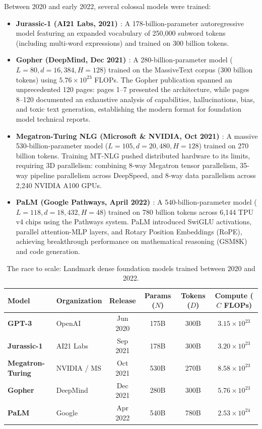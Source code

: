 \documentclass[../../main.tex]{subfiles}
\begin{document}
Between 2020 and early 2022, several colossal models were trained:
\begin{itemize}
    \item \textbf{Jurassic-1 (AI21 Labs, 2021) \cite{lieber2021jurassic}}:
    A 178-billion-parameter autoregressive model featuring an expanded vocabulary of 250,000 subword tokens (including multi-word expressions) and trained on 300 billion tokens.
    \item \textbf{Gopher (DeepMind, Dec 2021) \cite{rae2021gopher}}:
    A 280-billion-parameter model ($L = 80, d = 16,384, H = 128$) trained on the MassiveText corpus (300 billion tokens) using $5.76 \times 10^{23}$ FLOPs. The Gopher publication spanned an unprecedented 120 pages: pages 1--7 presented the architecture, while pages 8--120 documented an exhaustive analysis of capabilities, hallucinations, bias, and toxic text generation, establishing the modern format for foundation model technical reports.
    \item \textbf{Megatron-Turing NLG (Microsoft \& NVIDIA, Oct 2021) \cite{smith2022mtnlg}}:
    A massive 530-billion-parameter model ($L = 105, d = 20,480, H = 128$) trained on 270 billion tokens. Training MT-NLG pushed distributed hardware to its limits, requiring 3D parallelism: combining 8-way Megatron tensor parallelism, 35-way pipeline parallelism across DeepSpeed, and 8-way data parallelism across 2,240 NVIDIA A100 GPUs.
    \item \textbf{PaLM (Google Pathways, April 2022) \cite{chowdhery2023palm}}:
    A 540-billion-parameter model ($L = 118, d = 18,432, H = 48$) trained on 780 billion tokens across 6,144 TPU v4 chips using the Pathways system. PaLM introduced SwiGLU activations, parallel attention-MLP layers, and Rotary Position Embeddings (RoPE), achieving breakthrough performance on mathematical reasoning (GSM8K) and code generation.
\end{itemize}

\begin{table}[htbp]
\centering
\small
\caption{The race to scale: Landmark dense foundation models trained between 2020 and 2022.}
\label{tab:giant_models_comparison}
\begin{tabularx}{\textwidth}{lXcccc}
\toprule
\textbf{Model} & \textbf{Organization} & \textbf{Release} & \textbf{Params ($N$)} & \textbf{Tokens ($D$)} & \textbf{Compute ($C$ FLOPs)} \\
\midrule
\textbf{GPT-3} & OpenAI & Jun 2020 & 175B & 300B & $3.15 \times 10^{23}$ \\
\textbf{Jurassic-1} & AI21 Labs & Sep 2021 & 178B & 300B & $3.20 \times 10^{23}$ \\
\textbf{Megatron-Turing} & NVIDIA / MS & Oct 2021 & 530B & 270B & $8.58 \times 10^{23}$ \\
\textbf{Gopher} & DeepMind & Dec 2021 & 280B & 300B & $5.76 \times 10^{23}$ \\
\textbf{PaLM} & Google & Apr 2022 & 540B & 780B & $2.53 \times 10^{24}$ \\
\bottomrule
\end{tabularx}
\end{table}
\end{document}
